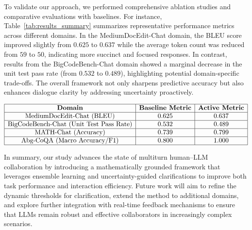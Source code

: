 \documentclass{article}
\begin{document}
To validate our approach, we performed comprehensive ablation studies and comparative evaluations with baselines. For instance, Table~\ref{tab:results_summary} summarizes representative performance metrics across different domains. In the MediumDocEdit-Chat domain, the BLEU score improved slightly from \(0.625\) to \(0.637\) while the average token count was reduced from \(59\) to \(50\), indicating more succinct and focused responses. In contrast, results from the BigCodeBench-Chat domain showed a marginal decrease in the unit test pass rate (from \(0.532\) to \(0.489\)), highlighting potential domain-specific trade-offs. The overall framework not only sharpens predictive accuracy but also enhances dialogue clarity by addressing uncertainty proactively.

\[
\begin{array}{|c|c|c|}
\hline
\textbf{Domain} & \textbf{Baseline Metric} & \textbf{Active Metric} \\
\hline
\text{MediumDocEdit-Chat (BLEU)} & 0.625 & 0.637 \\
\hline
\text{BigCodeBench-Chat (Unit Test Pass Rate)} & 0.532 & 0.489 \\
\hline
\text{MATH-Chat (Accuracy)} & 0.739 & 0.799 \\
\hline
\text{Abg-CoQA (Macro Accuracy/F1)} & 0.800 & 1.000 \\
\hline
\end{array}
\]
\label{tab:results_summary}

In summary, our study advances the state of multiturn human–LLM collaboration by introducing a mathematically grounded framework that leverages ensemble learning and uncertainty-guided clarifications to improve both task performance and interaction efficiency. Future work will aim to refine the dynamic thresholds for clarification, extend the method to additional domains, and explore further integration with real-time feedback mechanisms to ensure that LLMs remain robust and effective collaborators in increasingly complex scenarios.
\end{document}

